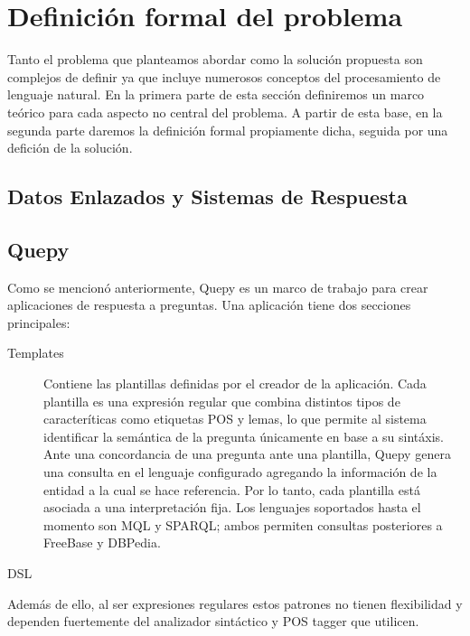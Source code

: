 
\chapter{Definición formal del problema}

Tanto el problema que planteamos abordar como la solución propuesta son complejos de definir ya que incluye numerosos conceptos del procesamiento de lenguaje natural. En la primera parte de esta sección definiremos un marco teórico para cada aspecto no central del problema. A partir de esta base, en la segunda parte daremos la definición formal propiamente dicha, seguida por una defición de la solución.

\section{Datos Enlazados y Sistemas de Respuesta}

\section{Quepy}

Como se mencionó anteriormente, Quepy es un marco de trabajo para crear aplicaciones de respuesta a preguntas. Una aplicación tiene dos secciones principales:
\begin{description}
    \item[Templates] Contiene las plantillas definidas por el creador de la aplicación. Cada plantilla es una expresión regular que combina distintos tipos de caracteríticas como etiquetas POS y lemas, lo que permite al sistema identificar la semántica de la pregunta únicamente en base a su sintáxis. Ante una concordancia de una pregunta ante una plantilla, Quepy genera una consulta en el lenguaje configurado agregando la información de la entidad a la cual se hace referencia. Por lo tanto, cada plantilla está asociada a una interpretación fija. Los lenguajes soportados hasta el momento son MQL y SPARQL; ambos permiten consultas posteriores a FreeBase y DBPedia.
    \item[DSL]
\end{description}


Además de ello, al ser expresiones regulares estos patrones no tienen flexibilidad y dependen fuertemente del analizador sintáctico y POS tagger que utilicen. 


